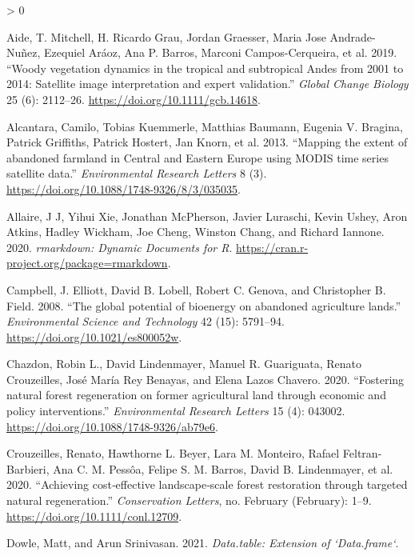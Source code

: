 \documentclass[
]{article}
\newlength{\cslhangindent}
\newenvironment{CSLReferences}[2] %
 {%
  \setlength{\parindent}{0pt}
  \ifodd #1 \everypar{\setlength{\hangindent}{\cslhangindent}}\ignorespaces\fi
  \ifnum #2 > 0
  \setlength{\parskip}{#2\baselineskip}
  \fi
 }%
 {}
\begin{document}
\hypertarget{refs}{}
\begin{CSLReferences}{1}{0}
\leavevmode\hypertarget{ref-Aide2019}{}%
Aide, T. Mitchell, H. Ricardo Grau, Jordan Graesser, Maria Jose Andrade-Nuñez, Ezequiel Aráoz, Ana P. Barros, Marconi Campos-Cerqueira, et al. 2019. {``{Woody vegetation dynamics in the tropical and subtropical Andes from 2001 to 2014: Satellite image interpretation and expert validation}.''} \emph{Global Change Biology} 25 (6): 2112--26. \url{https://doi.org/10.1111/gcb.14618}.

\leavevmode\hypertarget{ref-Alcantara2013}{}%
Alcantara, Camilo, Tobias Kuemmerle, Matthias Baumann, Eugenia V. Bragina, Patrick Griffiths, Patrick Hostert, Jan Knorn, et al. 2013. {``{Mapping the extent of abandoned farmland in Central and Eastern Europe using MODIS time series satellite data}.''} \emph{Environmental Research Letters} 8 (3). \url{https://doi.org/10.1088/1748-9326/8/3/035035}.

\leavevmode\hypertarget{ref-R-rmarkdown}{}%
Allaire, J J, Yihui Xie, Jonathan McPherson, Javier Luraschi, Kevin Ushey, Aron Atkins, Hadley Wickham, Joe Cheng, Winston Chang, and Richard Iannone. 2020. \emph{{rmarkdown: Dynamic Documents for R}}. \url{https://cran.r-project.org/package=rmarkdown}.

\leavevmode\hypertarget{ref-Campbell2008}{}%
Campbell, J. Elliott, David B. Lobell, Robert C. Genova, and Christopher B. Field. 2008. {``{The global potential of bioenergy on abandoned agriculture lands}.''} \emph{Environmental Science and Technology} 42 (15): 5791--94. \url{https://doi.org/10.1021/es800052w}.

\leavevmode\hypertarget{ref-Chazdon2020}{}%
Chazdon, Robin L., David Lindenmayer, Manuel R. Guariguata, Renato Crouzeilles, José María Rey Benayas, and Elena Lazos Chavero. 2020. {``{Fostering natural forest regeneration on former agricultural land through economic and policy interventions}.''} \emph{Environmental Research Letters} 15 (4): 043002. \url{https://doi.org/10.1088/1748-9326/ab79e6}.

\leavevmode\hypertarget{ref-Crouzeilles2020}{}%
Crouzeilles, Renato, Hawthorne L. Beyer, Lara M. Monteiro, Rafael Feltran-Barbieri, Ana C. M. Pessôa, Felipe S. M. Barros, David B. Lindenmayer, et al. 2020. {``{Achieving cost‐effective landscape‐scale forest restoration through targeted natural regeneration}.''} \emph{Conservation Letters}, no. February (February): 1--9. \url{https://doi.org/10.1111/conl.12709}.

\leavevmode\hypertarget{ref-R-data.table}{}%
Dowle, Matt, and Arun Srinivasan. 2021. \emph{Data.table: Extension of `Data.frame`}.


\end{CSLReferences}
\end{document}
